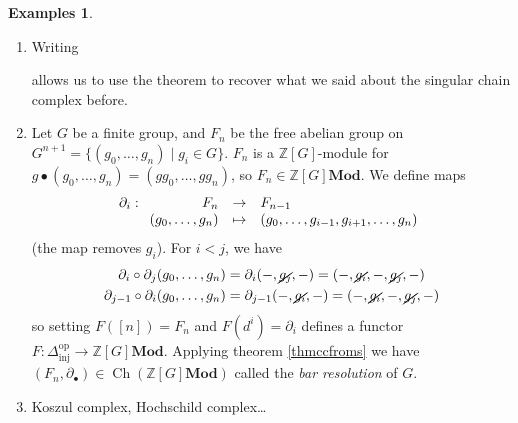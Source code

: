 \documentclass{article}
\newcommand{\op}{\mathrm{op}}
\newcommand{\inj}{\mathrm{inj}}
\newcommand{\Z}{\mathbb{Z}}
\newcommand{\Set}{\mathbf{Set}}
\newcommand{\Top}{\mathbf{Top}}
\newcommand{\Mod}{\mathbf{Mod}}
\newcommand{\Ab}{\mathbf{Ab}}
\DeclareMathOperator{\Ch}{Ch}
\DeclareMathOperator{\Hom}{Hom}
\newcommand{\applic}[4]{\begin{array}[t]{rcl}
#1 & \to & #2 \\
#3 & \mapsto & #4
\end{array}}
\theoremstyle{plain}
\theoremstyle{definition}
\newtheorem{examples}[theorem]{Examples}
\theoremstyle{remark}
\begin{document}
\begin{examples} \leavevmode
    \begin{enumerate}
        \item Writing
        \begin{center}
        \end{center}
        allows us to use the theorem to recover what we said about the singular chain complex before.
        \item Let $G$ be a finite group, and $F_n$ be the free abelian group on $G^{n+1} = \{(g_0,\dots,g_n) \mid g_i \in G\}$. $F_n$ is a $\Z[G]$-module for $g \bullet (g_0,\dots,g_n) = (gg_0,\dots,gg_n)$, so $F_n \in \Z[G]\Mod$. We define maps
        \[\partial_i : \applic{F_n}{F_{n-1}}{(g_0,\dots,g_n)}{(g_0,\dots,g_{i-1},g_{i+1},\dots,g_n)}\]
        (the map removes $g_i$). For $i < j$, we have
        \begin{align*}
            \partial_i \circ \partial_j (g_0,\dots,g_n) & = \partial_i (-,\cancel{g_j},-) = (-,\cancel{g_i},-,\cancel{g_j},-) \\
            \partial_{j-1} \circ \partial_i (g_0,\dots,g_n) & = \partial_{j-1} (-,\cancel{g_i},-) = (-,\cancel{g_i},-,\cancel{g_j},-)
        \end{align*}
        so setting $F([n]) = F_n$ and $F(d^i) = \partial_i$ defines a functor $F : \Delta_\inj^\op \to \Z[G]\Mod$. Applying theorem \ref{thmccfroms} we have $(F_n,\partial_\bullet) \in \Ch(\Z[G]\Mod)$ called the \emph{bar resolution} of $G$.
        \item Koszul complex, Hochschild complex\dots
    \end{enumerate}
\end{examples}
\end{document}
